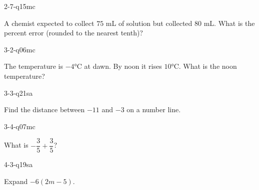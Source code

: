 \documentclass[12pt, fleqn, openany]{studyGuide}
\begin{document}
\begin{practiceQuestion}{2-7-q15}{mc}
\begin{questionText}
A chemist expected to collect $75$ mL of solution but collected $80$ mL. What is the percent error (rounded to the nearest tenth)?
\end{questionText}
\end{practiceQuestion}

\begin{practiceQuestion}{3-2-q06}{mc}
\begin{questionText}
The temperature is $-4°$C at dawn. By noon it rises $10°$C. What is the noon temperature?
\end{questionText}
\end{practiceQuestion}

\begin{practiceQuestion}{3-3-q21}{sa}
\begin{questionText}
Find the distance between $-11$ and $-3$ on a number line.
\end{questionText}
\end{practiceQuestion}

\begin{practiceQuestion}{3-4-q07}{mc}
\begin{questionText}
What is $-\dfrac{3}{5} + \dfrac{3}{5}$?
\end{questionText}
\end{practiceQuestion}

\begin{practiceQuestion}{4-3-q19}{sa}
\begin{questionText}
Expand $-6(2m - 5)$.
\end{questionText}
\end{practiceQuestion}
\end{document}
